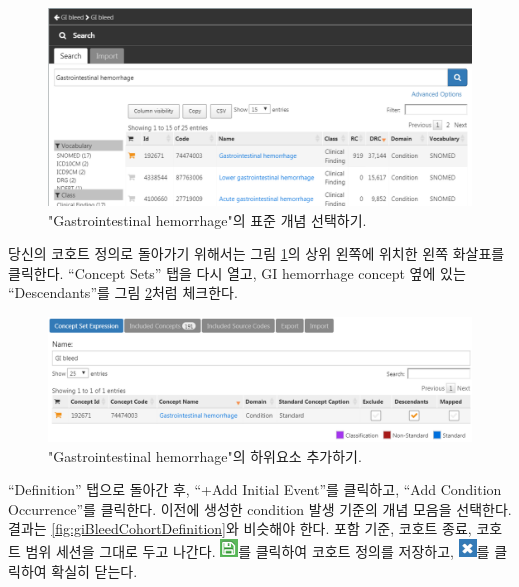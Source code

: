 \documentclass[10.5pt]{book}
\theoremstyle{definition}
\theoremstyle{definition}
\theoremstyle{definition}
\theoremstyle{remark}
\begin{document}
\begin{figure}

{\centering \includegraphics[width=1\linewidth]{images/SuggestedAnswers/giBleedSearch} 

}

\caption{"Gastrointestinal hemorrhage"의 표준 개념 선택하기.}\label{fig:giBleedSearch}
\end{figure}

당신의 코호트 정의로 돌아가기 위해서는 그림 \ref{fig:giBleedSearch}의
상위 왼쪽에 위치한 왼쪽 화살표를 클릭한다. ``Concept Sets'' 탭을 다시
열고, GI hemorrhage concept 옆에 있는 ``Descendants''를 그림
\ref{fig:giBleedDescendants}처럼 체크한다.

\begin{figure}

{\centering \includegraphics[width=1\linewidth]{images/SuggestedAnswers/giBleedDescendants} 

}

\caption{"Gastrointestinal hemorrhage"의 하위요소 추가하기.}\label{fig:giBleedDescendants}
\end{figure}

``Definition'' 탭으로 돌아간 후, ``+Add Initial Event''를 클릭하고,
``Add Condition Occurrence''를 클릭한다. 이전에 생성한 condition 발생
기준의 개념 모음을 선택한다. 결과는 \ref{fig:giBleedCohortDefinition}와
비슷해야 한다. 포함 기준, 코호트 종료, 코호트 범위 세션을 그대로 두고
나간다. \includegraphics{images/Cohorts/save.png}를 클릭하여 코호트
정의를 저장하고, \includegraphics{images/SuggestedAnswers/close.png}를
클릭하여 확실히 닫는다.
\end{document}
